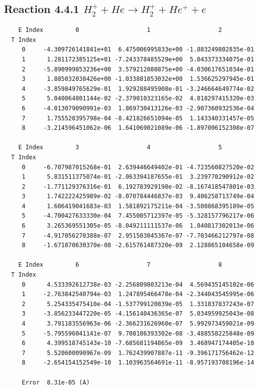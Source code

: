 \documentclass[12pt,dvipdfmx]{article}
\begin{document}
\newpage
\subsection{
Reaction 4.4.1 $    H_2^+ + He \rightarrow H_2^+ + He^+ + e$}


\begin{small}\begin{verbatim}
    E Index         0                   1                   2
  T Index
     0     -4.309726141841e+01  6.475006995833e+00 -1.883249802835e-01
     1      1.281172385125e+01 -7.243378485529e+00  5.043373334075e-01
     2     -5.890999853236e+00  3.579212080875e+00 -4.030617651034e-01
     3      1.885032038426e+00 -1.033881853032e+00  1.536625297945e-01
     4     -3.859849765629e-01  1.929288495908e-01 -3.246664649774e-02
     5      5.040064801144e-02 -2.379010323165e-02  4.018297415320e-03
     6     -4.013079090991e-03  1.869730413126e-03 -2.907360932536e-04
     7      1.755528395798e-04 -8.421826651094e-05  1.143340331457e-05
     8     -3.214596451062e-06  1.641069021089e-06 -1.897006152308e-07

    E Index         3                   4                   5
  T Index
     0     -6.707987015268e-01  2.639446649402e-01 -4.723560827520e-02
     1      5.831511375074e-01 -2.063394187655e-01  3.239770290912e-02
     2     -1.771129376316e-01  6.192783929198e-02 -8.167418547801e-03
     3      1.742222425989e-02 -8.070784446837e-03  9.406258713749e-04
     4      1.606419041683e-03  1.581892175211e-04 -3.508868395189e-05
     5     -4.700427633330e-04  7.455005712397e-05 -5.328157796217e-06
     6      3.265369551305e-05 -8.049211111537e-06  1.040817302013e-06
     7     -4.917056270388e-07  2.951503045367e-07 -7.703466212797e-08
     8     -1.671870630370e-08 -2.615761487320e-09  2.128865104658e-09

    E Index         6                   7                   8
  T Index
     0      4.533392612738e-03 -2.256809803213e-04  4.569435145102e-06
     1     -2.763842540794e-03  1.247895466478e-04 -2.344043545995e-06
     2      5.254335475410e-04 -1.537799120839e-05  1.331837837243e-07
     3     -3.856233447220e-05 -4.156140436365e-07  5.034959925043e-08
     4      3.791183556963e-06 -2.366231626960e-07  5.992973459021e-09
     5     -5.795596041141e-07  9.708186393302e-08 -3.488558225848e-09
     6      4.399518745143e-10 -7.685681194865e-09  3.468947174405e-10
     7      5.520600090967e-09  1.762439907887e-11 -9.396171756462e-12
     8     -2.654154152549e-10  1.103963564691e-11 -8.957193708196e-14

     Error  8.31e-05 (A)
\end{verbatim}\end{small}
\end{document}
